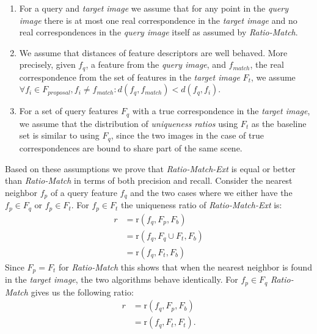 \documentclass[review]{elsarticle}
\begin{document}
\begin{enumerate}
    \item{For a query and \emph{target image} we assume that for any point in 
        the \emph{query image} there is at most one real correspondence in the 
    \emph{target image} and no real correspondences in the \emph{query image} itself 
as assumed by \emph{Ratio-Match}.}
    \item{We assume that distances of feature descriptors are well 
            behaved.  More precisely, given $f_q$, a feature from the 
            \emph{query image}, and $f_{match}$, the real correspondence 
            from the set of features in the \emph{target image} 
            $F_{t}$, we assume $\forall f_i \in F_{proposal}, 
            f_i \neq f_{match}: d(f_q,f_{match}) < d(f_q, f_i)$.}
     \item{For a set of query features $F_{q}$ with a true 
             correspondence in the \emph{target image}, we assume that 
             the distribution of \emph{uniqueness ratios} using $F_{t}$ as 
             the baseline set is similar to using $F_{q}$, since the 
         two images in the case of true correspondences are bound 
     to share part of the same scene.}
    \end{enumerate}

Based on these assumptions we prove that \emph{Ratio-Match-Ext} is equal
or better than \emph{Ratio-Match} in terms of both precision and recall.  Consider the nearest neighbor $f_{p}$ of a query feature $f_{q}$ and the two cases where we either have the $f_{p} \in F_{q}$ or $f_{p} \in F_{t}$. For $f_{p} \in F_{t}$ the uniqueness ratio of \emph{Ratio-Match-Ext} is:
\begin{align*}
    r &= \text{r}(f_{q}, F_{p}, F_{b}) \\
        &= \text{r}(f_{q}, F_{q} \cup F_{t}, F_{b})\\
        &= \text{r}(f_{q}, F_{t}, F_{b})
\end{align*}
Since $F_{p} = F_{t}$ for \emph{Ratio-Match} this shows that when the nearest neighbor is found in the \emph{target image}, the two algorithms behave identically. For $f_{p} \in F_{q}$ \emph{Ratio-Match} gives us the following ratio:
\begin{align*}
    r &= \text{r}(f_{q}, F_{p}, F_{b}) \\
        &= \text{r}(f_{q}, F_{t}, F_{t}).
\end{align*}
\end{document}
